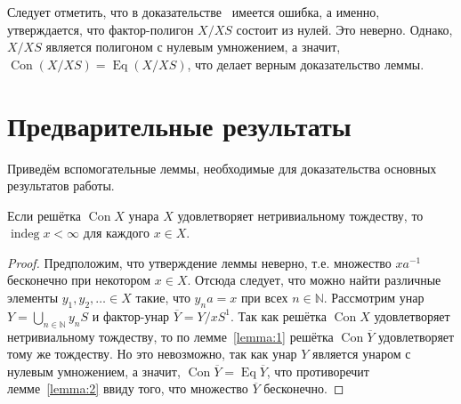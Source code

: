 \documentclass[11pt,twoside,final
]{article}
\def\Con{\operatorname{Con}}
\def\Eq{\operatorname{Eq}}
\def\indeg{\operatorname{indeg}}
\begin{document}
Следует отметить, что в доказательстве~\cite[лемма 4(2)]{Kozhukhov_8} имеется ошибка, а именно, утверждается, что фактор-полигон $X / XS$ состоит из нулей.
Это неверно. Однако, $X / XS$ является полигоном с нулевым умножением, а значит, $\Con (X/XS) = \Eq (X/XS)$, что делает верным доказательство леммы.

\section{Предварительные результаты}

Приведём вспомогательные леммы, необходимые для доказательства основных результатов работы.
\begin{lemma} \label{lemma:5}
	Если решётка $\Con X$ унара $X$ удовлетворяет нетривиальному тождеству, то $\indeg x < \infty$ для каждого $x \in X$.
\end{lemma}
\begin{proof}
	Предположим, что утверждение леммы неверно, т.е. множество $xa^{-1}$ бесконечно при некотором $x \in X$.
	Отсюда следует, что можно найти различные элементы $y_1, y_2, \ldots \in X $ такие, что $y_n a = x$ при всех $n \in \mathbb{N}$.
	Рассмотрим унар $Y = \bigcup_{n \in \mathbb{N}} y_n S$ и фактор-унар $\overline{Y} = Y / x S^1$.
	Так как решётка $\Con X$ удовлетворяет нетривиальному тождеству, то по лемме~\ref{lemma:1} решётка $\Con \overline{Y}$ удовлетворяет тому же тождеству.
	Но это невозможно, так как унар $Y$ является унаром с нулевым умножением, а значит, $\Con \overline{Y} = \Eq \overline{Y}$, что противоречит лемме~\ref{lemma:2} ввиду того, что множество $\overline{Y}$ бесконечно.
\end{proof}
\end{document}
